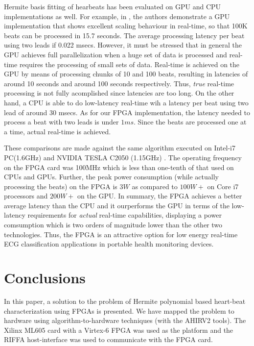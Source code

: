 \documentclass[conference]{IEEEtran}
\begin{document}
Hermite basis fitting of hearbeats has been evaluated on GPU and CPU implementations
as well.  For example, in \cite{c:GPU}, the authors demonstrate a
GPU implementation that shows excellent scaling behaviour in real-time, so that 
100K beats can be processed in 15.7 seconds. The average processing latency per 
beat using two leads if 0.022 msecs.  However, it must be stressed that in general the GPU achieves 
full parallelization when a huge set of data is processed and real-time requires the processing 
of small sets of data. Real-time is achieved on the GPU by means of processing chunks of 10 and 100 beats, 
resulting in latencies of around 10 seconds and around 100 seconds respectively. Thus, 
{\em true} real-time processing is not fully acomplished since latencies are too long. 
On the other hand, a CPU is able to do low-latency real-time wih a latency per beat using two lead of around 
30 msecs.  As for our FPGA implementation, the latency needed to process a beat with two leads
is under $1ms$. Since the beats are processed one at a time, actual real-time is achieved. 

These comparisons are made against the same algorithm executed on Intel-i7 PC(1.6GHz) 
and NVIDIA TESLA C2050 (1.15GHz) \cite{c:GPU}. The operating frequency on the FPGA
card was 100MHz which is less than one-tenth of that used on CPUs and GPUs.
Further, the peak power consumption (while actually processing the beats) on the FPGA is $3W$ as compared to 
$100W+$ on Core i7 processors and $200W+$ on the GPU.  %
In summary, the FPGA achieves a better average latency than the CPU and it ourperforms the 
GPU in terms of the low-latency requirements for \textit{actual} real-time capabilities, 
displaying a power comsumption which is two orders of magnitude lower than the other two technologies. 
Thus, the FPGA is an attractive option for low energy real-time ECG classification
applications in portable health monitoring devices.

\section{Conclusions}\label{s:conclusions}

In this paper, a solution to the problem of Hermite polynomial
based heart-beat characterization using FPGAs is presented.
We have mapped the problem to hardware using algorithm-to-hardware
techniques (with the AHIRV2 tools).  The Xilinx ML605 card with a
Virtex-6 FPGA was used as the platform and the RIFFA host-interface was used to
communicate with the FPGA card. 
\end{document}
